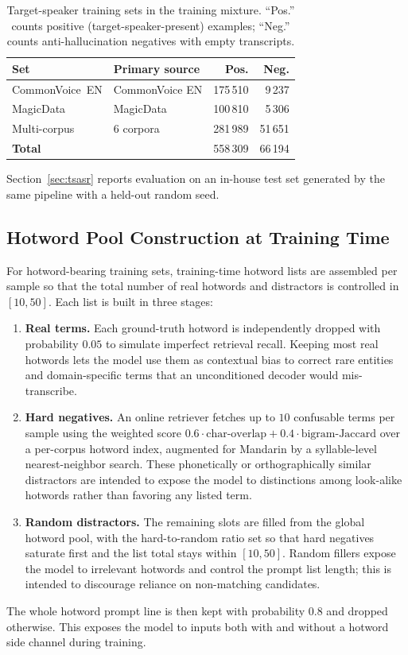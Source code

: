 \begin{table}[t]
  \caption{Target-speaker training sets in the training mixture.
    ``Pos.'' counts positive (target-speaker-present) examples;
    ``Neg.'' counts anti-hallucination negatives with empty
    transcripts.}
  \label{tab:ts_training_sets}
  \centering
  \small
  \setlength{\tabcolsep}{4pt}
  \begin{tabular}{llrr}
    \toprule
    Set & Primary source & Pos. & Neg. \\
    \midrule
    CommonVoice~EN & CommonVoice EN   & 175\,510 & 9\,237  \\
    MagicData      & MagicData        & 100\,810 & 5\,306  \\
    Multi-corpus   & 6 corpora        & 281\,989 & 51\,651 \\
    \midrule
    \textbf{Total} &                  & 558\,309 & 66\,194 \\
    \bottomrule
  \end{tabular}
\end{table}

Section~\ref{sec:tsasr} reports evaluation on an in-house test set
generated by the same pipeline with a held-out random seed.

\subsection{Hotword Pool Construction at Training Time}
\label{subsec:hotword-pool}

For hotword-bearing training sets, training-time hotword lists are
assembled per sample so that the total number of real hotwords and
distractors is controlled in $[10, 50]$. Each list is built in three
stages:

\begin{enumerate}
  \item \textbf{Real terms.} Each ground-truth hotword is
        independently dropped with probability $0.05$ to simulate
        imperfect retrieval recall. Keeping most real hotwords lets
        the model use them as contextual bias to correct rare entities
        and domain-specific terms that an unconditioned decoder would
        mis-transcribe.
  \item \textbf{Hard negatives.} An online retriever fetches up to
        $10$ confusable terms per sample using the weighted
        score $0.6\cdot\text{char-overlap} +
        0.4\cdot\text{bigram-Jaccard}$ over a per-corpus hotword
        index, augmented for Mandarin by a syllable-level
        nearest-neighbor search. These phonetically or
        orthographically similar distractors are intended to expose the
        model to distinctions among look-alike hotwords rather than
        favoring any listed term.
  \item \textbf{Random distractors.} The remaining slots are filled
        from the global hotword pool, with the hard-to-random ratio
        set so that hard negatives saturate first and the list total
        stays within $[10, 50]$. Random fillers expose the model to
        irrelevant hotwords and control the prompt list length; this is
        intended to discourage reliance on non-matching candidates.
\end{enumerate}

The whole hotword prompt line is then kept with probability $0.8$
and dropped otherwise. This exposes the model to inputs both with and
without a hotword side channel during training.
